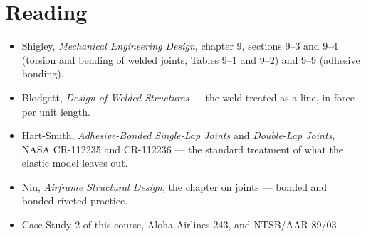 \documentclass[11pt,a4paper]{article}
\begin{document}
\section*{Reading}

\begin{itemize}[leftmargin=*,nosep]
\item Shigley, \emph{Mechanical Engineering Design}, chapter 9, sections 9--3 and 9--4 (torsion and
  bending of welded joints, Tables 9--1 and 9--2) and 9--9 (adhesive bonding).
\item Blodgett, \emph{Design of Welded Structures} --- the weld treated as a line, in force per
  unit length.
\item Hart-Smith, \emph{Adhesive-Bonded Single-Lap Joints} and \emph{Double-Lap Joints}, NASA
  CR-112235 and CR-112236 --- the standard treatment of what the elastic model leaves out.
\item Niu, \emph{Airframe Structural Design}, the chapter on joints --- bonded and bonded-riveted
  practice.
\item Case Study 2 of this course, Aloha Airlines 243, and NTSB/AAR-89/03.
\end{itemize}
\end{document}

